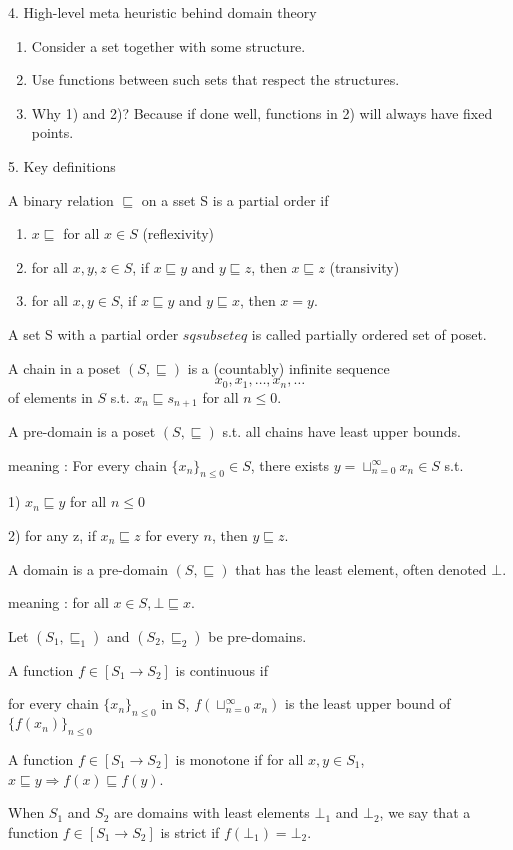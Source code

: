 \documentclass{report}[12pt]
\begin{document}
4. High-level meta heuristic behind domain theory
\begin{enumerate}
    \item Consider a set together with some structure.
    \item Use functions between such sets that respect the structures.
    \item Why 1) and 2)? Because if done well, functions in 2) will always have fixed points.
\end{enumerate}
5. Key definitions
\begin{definition}
    A binary relation $\sqsubseteq$ on a sset S is a partial order if
    \begin{enumerate}
        \item $x\sqsubseteq$ for all $x \in S$ (reflexivity)
        \item for all $x, y, z\in S$, if $x\sqsubseteq y$ and $y \sqsubseteq z$, then $x \sqsubseteq z$ (transivity)
        \item for all $x, y \in S$, if $x \sqsubseteq y$ and $y \sqsubseteq x$, then $x=y$.
    \end{enumerate}
    A set S with a partial order $sqsubseteq$ is called partially ordered set of poset.
\end{definition}
\begin{definition}
    A chain in a poset $(S, \sqsubseteq)$ is a (countably) infinite sequence
    \[x_0, x_1, \ldots, x_n, \ldots\]
    of elements in $S$ s.t. $x_n \sqsubseteq s_{n+1}$ for all $n \le 0$.
\end{definition}
\begin{definition}
    A pre-domain is a poset $(S, \sqsubseteq)$ s.t. all chains have least upper bounds.

    meaning : For every chain $\{x_n\}_{n\le 0} \in S$, there exists $y=\sqcup_{n=0}^\infty x_n \in S$ s.t.

    1) $x_n \sqsubseteq y$ for all $n \le 0$

    2) for any z, if $x_n \sqsubseteq z$ for every $n$, then $y \sqsubseteq z$.
\end{definition}
\begin{definition}
    A domain is a pre-domain $(S, \sqsubseteq)$ that has the least element, often denoted $\bot$.

    meaning : for all $x \in S, \bot \sqsubseteq x$.
\end{definition}
\begin{definition}
    Let $(S_1, \sqsubseteq_1)$ and $(S_2, \sqsubseteq_2)$ be pre-domains.

    A function $f\in [S_1 \rightarrow S_2]$ is continuous if

    for every chain $\{x_n\}_{n\le 0}$ in S, $f(\sqcup_{n=0}^\infty x_n)$ is the least upper bound of $\{f(x_n)\}_{n\le 0}$

    A function $f \in [S_1 \rightarrow S_2]$ is monotone if for all $x, y \in S_1$, $x\sqsubseteq y \Rightarrow f(x) \sqsubseteq f(y)$.

    When $S_1$ and $S_2$ are domains with least elements $\bot_1$ and $\bot_2$, we say that a function $f\in [S_1 \rightarrow S_2]$ is strict if $f(\bot_1) = \bot_2$.
\end{definition}
\end{document}
